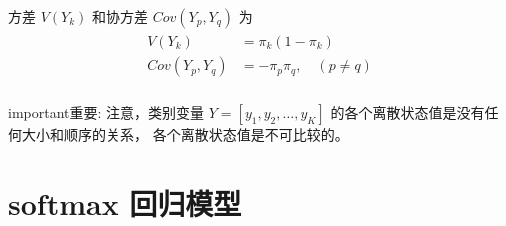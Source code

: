\documentclass[letterpaper,10pt,english]{sphinxmanual}
\begin{document}
方差 \(V(Y_k)\) 和协方差 \(Cov(Y_p,Y_q)\) 为
\begin{align}\label{equation:无序离散模型/content:无序离散模型/content:5}\!\begin{aligned}
V(Y_k) &=  \pi_k(1-\pi_k)\\
Cov(Y_p,Y_q) &= - \pi_p \pi_q, \quad (p \ne q)\\
\end{aligned}\end{align}
\begin{sphinxadmonition}{important}{重要:}
注意，类别变量 \(Y=[y_1,y_2,\dots,y_K]\) 的各个离散状态值是没有任何大小和顺序的关系，
各个离散状态值是不可比较的。
\end{sphinxadmonition}


\section{softmax 回归模型}
\label{\detokenize{_u65e0_u5e8f_u79bb_u6563_u6a21_u578b/content:softmax}}
\end{document}
